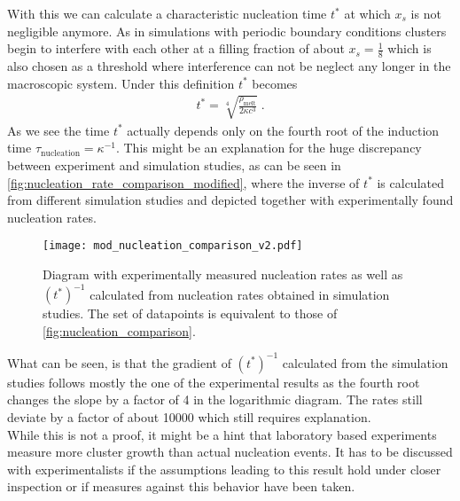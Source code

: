 With this we can calculate a characteristic nucleation time $t^*$ at which $x_s$ is not negligible anymore. As in simulations with periodic boundary conditions clusters begin to interfere with each other at a filling fraction of about $x_s=\frac{1}{8}$ which is also chosen as a threshold where interference can not be neglect any longer in the macroscopic system. Under this definition $t^*$ becomes
\begin{align}
\label{eqn:nucleation_time_modified}
t^* = \sqrt[4]{\frac{\rho_{\text{melt}}}{2 \kappa c^3 }} \; \text{.}
\end{align}
As we see the time $t^*$ actually depends only on the fourth root of the induction time $\tau_{\text{nucleation}} = \kappa^{-1}$. This might be an explanation for the huge discrepancy between experiment and simulation studies, as can be seen in \autoref{fig:nucleation_rate_comparison_modified}, where the inverse of $t^*$ is calculated from different simulation studies and depicted together with experimentally found nucleation rates.\\
\begin{figure}[h]
\centering
\texttt{[image: mod\_nucleation\_comparison\_v2.pdf]}
\caption[Nucleation rate comparison under assumption of early filled boxes]{Diagram with experimentally measured nucleation rates\cite{Harland1997,He1996,schaetzel1993,Sinn2001,Auer2001} as well as $(t^*)^{-1}$ calculated from nucleation rates obtained in simulation studies\cite{Filion2010a,Fiorucci2020a,Schilling2011}. The set of datapoints is equivalent to those of \autoref{fig:nucleation_comparison}.}
\label{fig:nucleation_rate_comparison_modified}
\end{figure}

What can be seen, is that the gradient of $(t^*)^{-1}$ calculated from the simulation studies follows mostly the one of the experimental results as the fourth root changes the slope by a factor of 4 in the logarithmic diagram. The rates still deviate by a factor of about 10000 which still requires explanation.\\

While this is not a proof, it might be a hint that laboratory based experiments measure more cluster growth than actual nucleation events. It has to be discussed with experimentalists if the assumptions leading to this result hold under closer inspection or if measures against this behavior have been taken.

